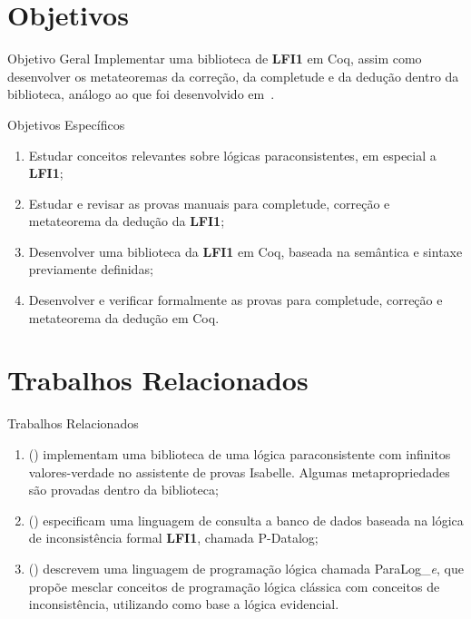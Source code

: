 \documentclass[xcolor=table]{beamer}
\newcommand{\lfium}{{\normalfont\textbf{LFI1}}}
\begin{document}
\section[]{Objetivos}
    \begin{frame}{Objetivo Geral}
        Implementar uma biblioteca de \lfium{} em Coq, assim como desenvolver os metateoremas da correção, da completude e da dedução dentro da biblioteca, análogo ao que foi desenvolvido em~\cite{silveira2020implementacao}.
    \end{frame}

    \begin{frame}{Objetivos Específicos}
        \begin{enumerate}
			\item Estudar conceitos relevantes sobre lógicas paraconsistentes, em especial a \lfium{};
            \item Estudar e revisar as provas manuais para completude, correção e metateorema da dedução da \lfium{};
            \item Desenvolver uma biblioteca da \lfium{} em Coq, baseada na semântica e sintaxe previamente definidas;
            \item Desenvolver e verificar formalmente as provas para completude, correção e metateorema da dedução em Coq.
		\end{enumerate}
    \end{frame}

\section[]{Trabalhos Relacionados}
    \begin{frame}{Trabalhos Relacionados}
        \begin{enumerate}
            \item {} (\citeyear{Villadsen2017}) implementam uma biblioteca de uma lógica paraconsistente com infinitos valores-verdade no assistente de provas Isabelle. Algumas metapropriedades são provadas dentro da biblioteca;
            \item {} (\citeyear{pdatalog}) especificam uma linguagem de consulta a banco de dados baseada na lógica de inconsistência formal \lfium{}, chamada P{-}Datalog;
            \item {} (\citeyear{paralog}) descrevem uma linguagem de programação lógica chamada ParaLog\_\textit{e}, que propõe mesclar conceitos de programação lógica clássica com conceitos de inconsistência, utilizando como base a lógica evidencial.
        \end{enumerate}
    \end{frame}
\end{document}

